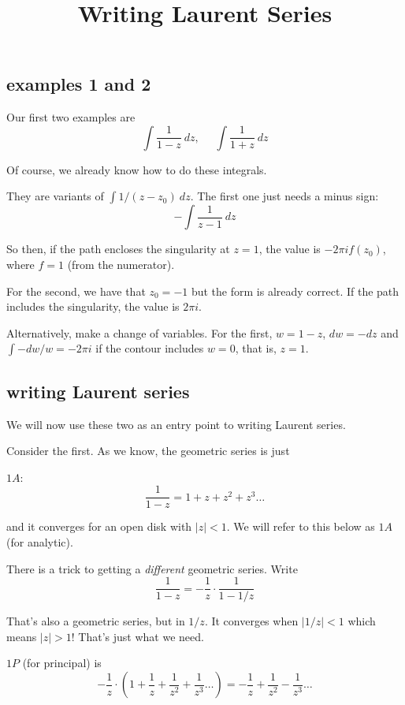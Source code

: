 \documentclass[11pt, oneside]{article}
\title{Writing Laurent Series}
\date{}
\begin{document}
\maketitle
\Large


\subsection*{examples 1 and 2}

\label{sec:ex1L}
\label{sec:ex2L}

Our first two examples are
\[ \int \frac{1}{1 - z} \ dz, \ \ \ \ \ \ \int \frac{1}{1 + z} \ dz \]  

Of course, we already know how to do these integrals.  

They are variants of $\int 1/(z - z_0) \ dz$.  The first one just needs a minus sign:
\[ - \int \frac{1}{z - 1} \ dz \]

So then, if the path encloses the singularity at $z = 1$, the value is $-2 \pi i f(z_0)$, where $f = 1$ (from the numerator).

For the second, we have that $z_0 = -1$ but the form is already correct.  If the path includes the singularity, the value is $2 \pi i$.

Alternatively, make a change of variables.  For the first, $w = 1 - z$, $dw = -dz$ and $\int -dw/w = -2 \pi i$ if the contour includes $w = 0$, that is, $z = 1$.

\subsection*{writing Laurent series}

We will now use these two as an entry point to writing Laurent series.  

Consider the first.  As we know, the geometric series is just

$1A$:
\[ \frac{1}{1 - z} = 1 + z + z^2 + z^3 \dots \]

and it converges for an open disk with $|z| < 1$.  We will refer to this below as $1A$ (for analytic).

There is a trick to getting a \emph{different} geometric series.  Write
\[ \frac{1}{1 - z} = -\frac{1}{z} \cdot \frac{1}{1 - 1/z} \]

That's also a geometric series, but in $1/z$.  It converges when $|1/z| < 1$ which means $|z| > 1$!  That's just what we need.

$1P$ (for principal) is
\[ -\frac{1}{z} \cdot (1 + \frac{1}{z} + \frac{1}{z^2} + \frac{1}{z^3} \dots ) = - \frac{1}{z} + \frac{1}{z^2} - \frac{1}{z^3} \dots \]
\end{document}

